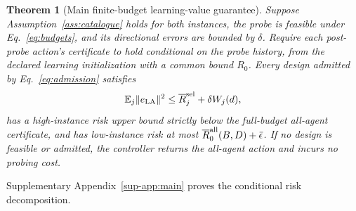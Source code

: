 \documentclass[journal]{IEEEtran}
\newtheorem{theorem}{Theorem}
\newcommand{\E}{\mathbb{E}}
\begin{document}
\begin{theorem}[Main finite-budget learning-value guarantee]
Suppose Assumption~\ref{ass:catalogue} holds for both instances, the probe is feasible under Eq.~\eqref{eq:budgets}, and its directional errors are bounded by $\delta$.
Require each post-probe action's certificate to hold conditional on the probe history, from the declared learning initialization with a common bound $R_0$.
Every design admitted by Eq.~\eqref{eq:admission} satisfies
\begin{equation}
\E_j\|e_{\rm LA}\|^2\le \overline R_j^{\rm sel}+\delta W_j(d),
\label{eq:main-risk}
\end{equation}
has a high-instance risk upper bound strictly below the full-budget all-agent certificate, and has low-instance risk at most $\overline R_0^{\rm all}(B,D)+\bar\epsilon$.
If no design is feasible or admitted, the controller returns the all-agent action and incurs no probing cost.
\label{thm:main}
\end{theorem}
Supplementary Appendix~\ref{sup-app:main} proves the conditional risk decomposition.
\end{document}
